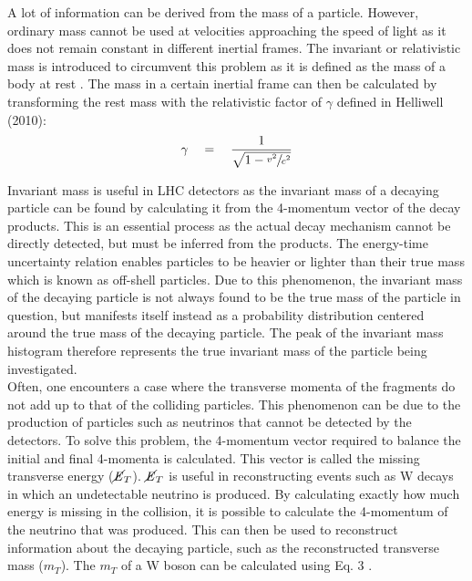 \documentclass[runningheads,a4paper]{llncs}
\begin{document}
A lot of information can be derived from the mass of a particle. However, ordinary mass cannot be used at velocities approaching the speed of light as it does not remain constant in different inertial frames. The invariant or relativistic mass is introduced to circumvent this problem as it is defined as the mass of a body at rest \cite{helliwell2010special}. The mass in a certain inertial frame can then be calculated by transforming the rest mass with the relativistic factor of $\gamma$ defined in Helliwell (2010):\\

\begin{equation}
\gamma \quad =\quad \frac { 1 }{ \sqrt { 1-\sfrac { { v }^{ 2 } }{ { c }^{ 2 } }  }  } 
\end{equation}

Invariant mass is useful in LHC detectors as the invariant mass of a decaying particle can be found by calculating it from the 4-momentum vector of the decay products. This is an essential process as the actual decay mechanism cannot be directly detected, but must be inferred from the products. The energy-time uncertainty relation enables particles to be heavier or lighter than their true mass which is known as off-shell particles. Due to this phenomenon, the invariant mass of the decaying particle is not always found to be the true mass of the particle in question, but manifests itself instead as a probability distribution centered around the true mass of the decaying particle. The peak of the invariant mass histogram therefore represents the true invariant mass of the particle being investigated.\\

Often, one encounters a case where the transverse momenta of the fragments do not add up to that of the colliding particles. This phenomenon can be due to the production of particles such as neutrinos that cannot be detected by the detectors. To solve this problem, the 4-momentum vector required to balance the initial and final 4-momenta is calculated. This vector is called the missing transverse energy ($\cancel{\it{E}}_{T}$). $\cancel{\it{E}}_{T}$ is useful in reconstructing events such as W decays in which an undetectable neutrino is produced. By calculating exactly how much energy is missing in the collision, it is possible to calculate the 4-momentum of the neutrino that was produced. This can then be used to reconstruct information about the decaying particle, such as the reconstructed transverse mass (${m}_{T}$). The ${m}_{T}$ of a W boson can be calculated using Eq. 3 \cite{aaltonen2012precise}.\\
\end{document}

